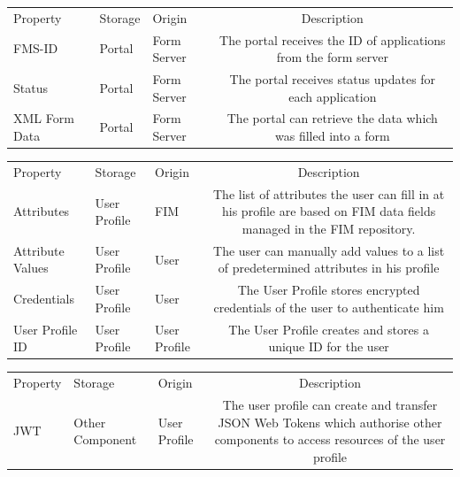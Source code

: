 \begin{table}[!h]
    \begin{tabularx}{\textwidth}{|l|l|l|C|}
    \hline
     \\
    \hline
    Property & Storage & Origin & Description  \\
    \hline
    \hline
    FMS-ID & Portal & Form Server & The portal receives the ID of applications from the form server \\
    \hline
    Status & Portal & Form Server & The portal receives status updates for each application \\
    \hline
    XML Form Data & Portal & Form Server & The portal can retrieve the data which was filled into a form \\
    \hline
    \end{tabularx}
\end{table}

\begin{table}[!h]
    \begin{tabularx}{\textwidth}{|l|l|l|C|}
    \hline
     \\
    \hline
    Property & Storage & Origin & Description  \\
    \hline
    \hline
    Attributes & User Profile & FIM & The list of attributes the user can fill in at his profile are based on FIM data fields managed in the FIM repository. \\
    \hline
    Attribute Values & User Profile & User & The user can manually add values to a list of predetermined attributes in his profile \\
    \hline
    Credentials & User Profile & User & The User Profile stores encrypted credentials of the user to authenticate him \\
    \hline
    User Profile ID & User Profile & User Profile & The User Profile creates and stores a unique ID for the user \\
    \hline
    \end{tabularx}
\end{table}

\begin{table}[!h]
    \begin{tabularx}{\textwidth}{|l|l|l|C|}
    \hline
     \\
    \hline
    Property & Storage & Origin & Description  \\
    \hline
    \hline
    JWT & Other Component & User Profile & The user profile can create and transfer JSON Web Tokens which authorise other components to access resources of the user profile \\
    \hline
    \end{tabularx}
\end{table}

